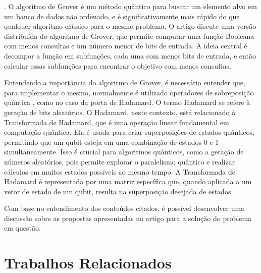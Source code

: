 \documentclass[12pt]{article}
\begin{document}
\textbf{\cite{grover:96}}. O algoritmo de Grover é um método quântico para buscar um elemento alvo em um banco de dados não ordenado, e é significativamente mais rápido do que qualquer algoritmo clássico para o mesmo problema. O artigo discute uma versão distribuída do algoritmo de Grover, que permite computar uma função Booleana com menos consultas e um número menor de bits de entrada. A ideia central é decompor a função em subfunções, cada uma com menos bits de entrada, e então calcular essas subfunções para encontrar o objetivo com menos consultas.

Entendendo a importância do algoritmo de Grover, é necessário entender que, para implementar o mesmo, normalmente é utilizado operadores de sobreposição quântica , como no caso da porta de Hadamard.\textbf{\cite{silva:18}} O termo Hadamard se refere à geração de bits aleatórios. O Hadamard, neste contexto, está relacionado à Transformada de Hadamard, que é uma operação linear fundamental em computação quântica. Ela é usada para criar superposições de estados quânticos, permitindo que um qubit esteja em uma combinação de estados 0 e 1 simultaneamente. Isso é crucial para algoritmos quânticos, como a geração de números aleatórios, pois permite explorar o paralelismo quântico e realizar cálculos em muitos estados possíveis ao mesmo tempo. A Transformada de Hadamard é representada por uma matriz específica que, quando aplicada a um vetor de estado de um qubit, resulta na superposição desejada de estados.

Com base no entendimento dos conteúdos citados, é possível desenvolver uma discussão sobre as propostas apresentadas no artigo para a solução do problema em questão.

\section{Trabalhos Relacionados}
\end{document}
